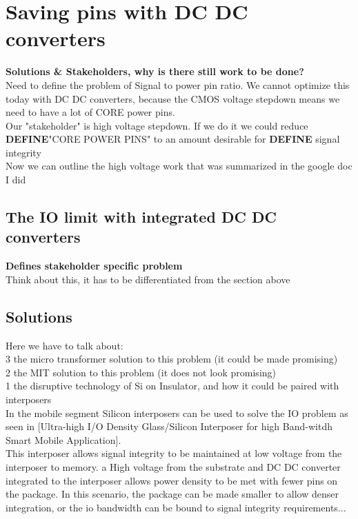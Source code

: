 \documentclass[letterpaper,twocolumn,10pt]{article}
\begin{document}
\section{Saving pins with DC DC converters}

\textbf{Solutions \& Stakeholders, why is there still work to be done?}\\
Need to define the problem of Signal to power pin ratio. We cannot optimize this today with DC DC converters, because the \@ CMOS voltage stepdown means we need to have a lot of CORE power pins.\\
Our "stakeholder" is high voltage stepdown. If we do it we could reduce \textbf{DEFINE}"CORE POWER PINS" to an amount desirable for \textbf{DEFINE} signal integrity\\
Now we can outline the high voltage work that was summarized in the google doc I did

\subsection{The IO limit with integrated DC DC converters}

\textbf{Defines stakeholder specific problem}\\
Think about this, it has to be differentiated from the section above

\subsection{Solutions}

Here we have to talk about:\\
3 the micro transformer solution to this problem (it could be made promising) \\
2 the MIT solution to this problem (it does not look promising)\\
1 the disruptive technology of Si on Insulator, and how it could be paired with interposers\\
In the mobile segment Silicon interposers can be used to solve the IO problem as seen in [Ultra-high I/O Density Glass/Silicon Interposer for high Band-witdh Smart Mobile Application].\\
This interposer allows signal integrity to be maintained at low voltage from the interposer to memory. a High voltage from the substrate and DC DC converter integrated to the interposer allows power density to be met with fewer pins on the package. In this scenario, the package can be made smaller to allow denser integration, or the io bandwidth  can be bound to signal integrity requirements...\\
\end{document}
